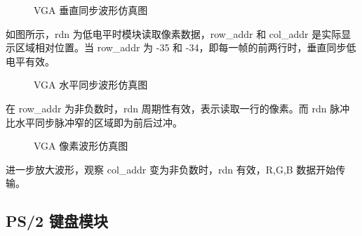 \documentclass[hyperref,UTF8,12pt,a4paper]{ctexart}
\begin{document}
\begin{figure}[H]
\centering
{}
\caption{VGA 垂直同步波形仿真图}
\end{figure}

如图所示，rdn 为低电平时模块读取像素数据，row\_addr 和 col\_addr
是实际显示区域相对位置。当 row\_addr 为 -35 和
-34，即每一帧的前两行时，垂直同步低电平有效。

\begin{figure}[H]
\centering
{}
\caption{VGA 水平同步波形仿真图}
\end{figure}

在 row\_addr 为非负数时，rdn 周期性有效，表示读取一行的像素。而 rdn
脉冲比水平同步脉冲窄的区域即为前后过冲。

\begin{figure}[H]
\centering
{}
\caption{VGA 像素波形仿真图}
\end{figure}

进一步放大波形，观察 col\_addr 变为非负数时，rdn 有效，R,G,B
数据开始传输。

\hypertarget{ps2-ux952eux76d8ux6a21ux5757}{%
\subsection{PS/2 键盘模块}\label{ps2-ux952eux76d8ux6a21ux5757}}
\end{document}
